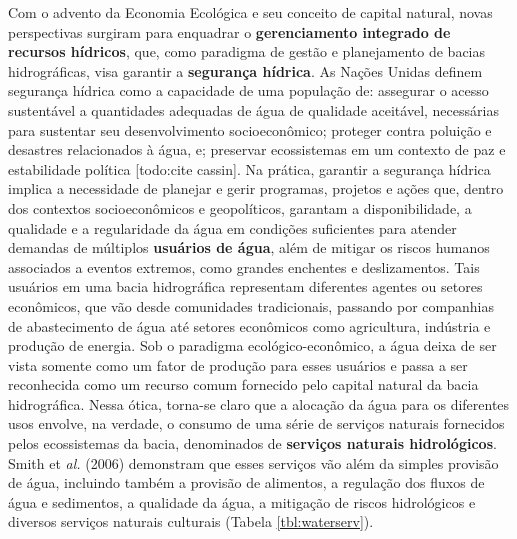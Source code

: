 \documentclass[./main.tex]{subfiles}
\begin{document}
\par Com o advento da Economia Ecológica e seu conceito de capital natural, novas perspectivas surgiram para enquadrar o \textbf{gerenciamento integrado de recursos hídricos}, que, como paradigma de gestão e planejamento de bacias hidrográficas, visa garantir a \textbf{segurança hídrica}. As Nações Unidas definem segurança hídrica como a capacidade de uma população de: assegurar o acesso sustentável a quantidades adequadas de água de qualidade aceitável, necessárias para sustentar seu desenvolvimento socioeconômico; proteger contra poluição e desastres relacionados à água, e; preservar ecossistemas em um contexto de paz e estabilidade política [todo:cite cassin]. Na prática, garantir a segurança hídrica implica a necessidade de planejar e gerir programas, projetos e ações que, dentro dos contextos socioeconômicos e geopolíticos, garantam a disponibilidade, a qualidade e a regularidade da água em condições suficientes para atender demandas de múltiplos \textbf{usuários de água}, além de mitigar os riscos humanos associados a eventos extremos, como grandes enchentes e deslizamentos. Tais usuários em uma bacia hidrográfica representam diferentes agentes ou setores econômicos, que vão desde comunidades tradicionais, passando por companhias de abastecimento de água até setores econômicos como agricultura, indústria e produção de energia. Sob o paradigma ecológico-econômico, a água deixa de ser vista somente como um fator de produção para esses usuários e passa a ser reconhecida como um recurso comum fornecido pelo capital natural da bacia hidrográfica. Nessa ótica, torna-se claro que a alocação da água para os diferentes usos envolve, na verdade, o consumo de uma série de serviços naturais fornecidos pelos ecossistemas da bacia, denominados de \textbf{serviços naturais hidrológicos}. Smith et \textit{al.} (2006) \cite{Smith2006a} demonstram que esses serviços vão além da simples provisão de água, incluindo também a provisão de alimentos, a regulação dos fluxos de água e sedimentos, a qualidade da água, a mitigação de riscos hidrológicos e diversos serviços naturais culturais (Tabela \ref{tbl:waterserv}).
\end{document}

